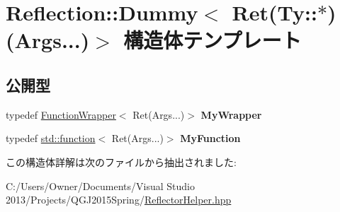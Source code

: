 \hypertarget{struct_reflection_1_1_dummy_3_01_ret_07_ty_1_1_5_08_07_args_8_8_8_08_4}{}\section{Reflection\+:\+:Dummy$<$ Ret(Ty\+:\+:$\ast$)(Args...)$>$ 構造体テンプレート}
\label{struct_reflection_1_1_dummy_3_01_ret_07_ty_1_1_5_08_07_args_8_8_8_08_4}
\subsection*{公開型}
\begin{DoxyCompactItemize}
\item 
typedef \hyperlink{class_reflection_1_1_function_wrapper}{Function\+Wrapper}$<$ Ret(Args...)$>$ {\bfseries My\+Wrapper}\hypertarget{struct_reflection_1_1_dummy_3_01_ret_07_ty_1_1_5_08_07_args_8_8_8_08_4_a57946df79f7ce1a11dd756875992bde7}{}\label{struct_reflection_1_1_dummy_3_01_ret_07_ty_1_1_5_08_07_args_8_8_8_08_4_a57946df79f7ce1a11dd756875992bde7}

\item 
typedef \hyperlink{classstd_1_1function}{std\+::function}$<$ Ret(Args...)$>$ {\bfseries My\+Function}\hypertarget{struct_reflection_1_1_dummy_3_01_ret_07_ty_1_1_5_08_07_args_8_8_8_08_4_a1cd97a9336a87b60f62ef321a37bfc50}{}\label{struct_reflection_1_1_dummy_3_01_ret_07_ty_1_1_5_08_07_args_8_8_8_08_4_a1cd97a9336a87b60f62ef321a37bfc50}

\end{DoxyCompactItemize}


この構造体詳解は次のファイルから抽出されました\+:\begin{DoxyCompactItemize}
\item 
C\+:/\+Users/\+Owner/\+Documents/\+Visual Studio 2013/\+Projects/\+Q\+G\+J2015\+Spring/\hyperlink{_reflector_helper_8hpp}{Reflector\+Helper.\+hpp}\end{DoxyCompactItemize}

